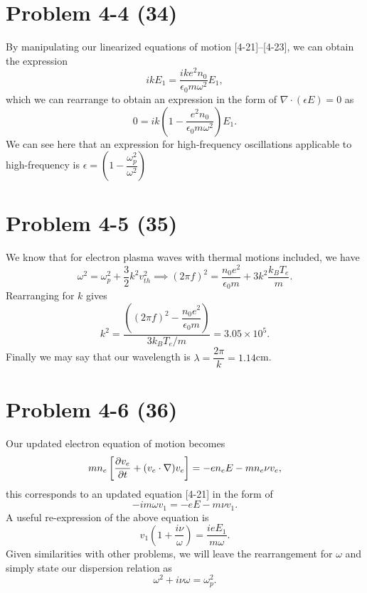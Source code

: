 \section*{Problem 4-4 (34)}
\label{sec:4-4}
By manipulating our linearized equations of motion [4-21]--[4-23], we can obtain the expression
\begin{equation*}
	ikE_1 = \dfrac{ike^2n_0}{\epsilon_0m\omega^2}E_1,
\end{equation*}
which we can rearrange to obtain an expression in the form of \(\nabla \cdot \left(\epsilon E \right) = 0 \) as 
\begin{equation*}
	0 = ik\left(1 - \dfrac{e^2n_0}{\epsilon_0 m \omega^2} \right)E_1.
\end{equation*}
We can see here that an expression for high-frequency oscillations applicable to high-frequency is \(\epsilon = \left(1 - \dfrac{\omega_p^2}{\omega^2} \right) \)

\section*{Problem 4-5 (35)}
\label{sec:4-5}
We know that for electron plasma waves with thermal motions included, we have
\begin{equation*}
	\omega^2 = \omega_p^2 + \dfrac{3}{2}k^2v_{th}^2 \implies (2\pi f)^2 = \dfrac{n_0 e^2}{\epsilon_0 m} + 3k^2\dfrac{k_BT_e}{m}.
\end{equation*}
Rearranging for \(k\) gives
\begin{equation*}
	k^2 = \dfrac{\left((2\pi f)^2 - \dfrac{n_0e^2}{\epsilon_0m} \right)}{3k_BT_e/m} = 3.05 \times 10^5.
\end{equation*}
Finally we may say that our wavelength is \(\lambda = \dfrac{2\pi}{k} = 1.14 \)cm.

\section*{Problem 4-6 (36)}
\label{sec:4-6}
Our updated electron equation of motion becomes
\begin{equation*}
	mn_e\left[\frac{\partial v_e}{\partial t} + (v_e\cdot\nabla)v_e \right] = -en_eE - mn_e\nu v_e,
\end{equation*}
this corresponds to an updated equation [4-21] in the form of
\begin{equation*}
	-im\omega v_1 = -eE - m\nu v_1.
\end{equation*}
A useful re-expression of the above equation is
\begin{equation*}
	v_1 \left(1 + \dfrac{i\nu}{\omega} \right) = \dfrac{ieE_1}{m\omega}.
\end{equation*}
Given similarities with other problems, we will leave the rearrangement for \(\omega \) and simply state our dispersion relation as
\begin{equation*}
	\omega^2 + i\nu\omega = \omega_p^2.
\end{equation*}


